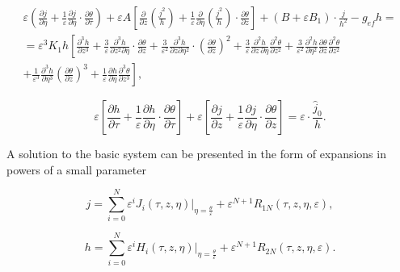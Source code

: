 \begin{multline*}
\varepsilon \left(
    \frac{\partial j}{\partial \eta}
    + \frac{1}{\varepsilon} \frac{\partial j}{\partial \eta} \cdot \frac{\partial \theta}{\partial \tau}
\right)
+ \varepsilon A \left[
    \frac{\partial}{\partial z} \left( \frac{j^2}{h} \right)
    + \frac{1}{\varepsilon} \frac{\partial}{\partial \eta} \left( \frac{j^2}{h} \right) \cdot \frac{\partial \theta}{\partial z}
\right]
+ \left( B + \varepsilon B_1 \right) \cdot \frac{j}{h^2}
- g_{\mathit{ef}} h =\\
= \varepsilon^3 K_1 h \left[
    \frac{\partial^3 h}{\partial z^3}
    + \frac{3}{\varepsilon} \frac{\partial^3 h}{\partial z^2 \partial \eta} \cdot \frac{\partial \theta}{\partial z}
    + \frac{3}{\varepsilon^2} \frac{\partial^3 h}{\partial z \partial \eta^2} \cdot \left( \frac{\partial \theta}{\partial z} \right)^2
    + \frac{3}{\varepsilon} \frac{\partial^2 h}{\partial z\, \partial \eta} \frac{\partial^2 \theta}{\partial z^2}
+ \frac{3}{\varepsilon^2} \frac{\partial^2 h}{\partial \eta^2} \frac{\partial \theta}{\partial z} \frac{\partial^2 \theta}{\partial z^2}\right.\\\left.
+ \frac{1}{\varepsilon^3} \frac{\partial^3 h}{\partial \eta^3} \left( \frac{\partial \theta}{\partial z} \right)^3
+ \frac{1}{\varepsilon} \frac{\partial h}{\partial \eta} \frac{\partial^3 \theta}{\partial z^3}
\right],
\end{multline*}

\begin{equation}
\varepsilon \left[ \frac{\partial h}{\partial \tau}
+ \frac{1}{\varepsilon} \frac{\partial h}{\partial \eta} \cdot \frac{\partial \theta}{\partial \tau} \right]
+ \varepsilon \left[ \frac{\partial j}{\partial z}
+ \frac{1}{\varepsilon} \frac{\partial j}{\partial \eta} \cdot \frac{\partial \theta}{\partial z} \right]
= \varepsilon \cdot \frac{\hat{j}_0}{h}.
\end{equation}

A solution to the basic system can be presented in the form of
expansions in powers of a small parameter

\begin{equation}
j = \sum_{i=0}^{N} \varepsilon^i J_i(\tau, z, \eta) \bigg|_{\eta = \frac{\theta}{\varepsilon}} + \varepsilon^{N+1} R_{1N}(\tau, z, \eta, \varepsilon),
\end{equation}

\begin{equation}
h = \sum_{i=0}^{N} \varepsilon^i H_i(\tau, z, \eta) \bigg|_{\eta = \frac{\theta}{\varepsilon}} + \varepsilon^{N+1} R_{2N}(\tau, z, \eta, \varepsilon).
\end{equation}


